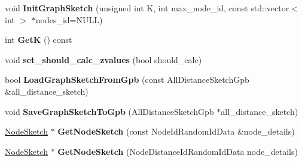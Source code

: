 \begin{DoxyCompactItemize}
\item 
\hypertarget{classall__distance__sketch_1_1GraphSketch_a6d41436a73844dd633b6184a89ce83ff}{}void {\bfseries Init\+Graph\+Sketch} (unsigned int K, int max\+\_\+node\+\_\+id, const std\+::vector$<$ int $>$ $\ast$nodes\+\_\+id=N\+U\+L\+L)\label{classall__distance__sketch_1_1GraphSketch_a6d41436a73844dd633b6184a89ce83ff}

\item 
\hypertarget{classall__distance__sketch_1_1GraphSketch_a32fef9d13b965dd7b5a776596d888a41}{}int {\bfseries Get\+K} () const \label{classall__distance__sketch_1_1GraphSketch_a32fef9d13b965dd7b5a776596d888a41}

\item 
\hypertarget{classall__distance__sketch_1_1GraphSketch_a8d5aaa1b4e94e0361ea0b1afdbfcf8bc}{}void {\bfseries set\+\_\+should\+\_\+calc\+\_\+zvalues} (bool should\+\_\+calc)\label{classall__distance__sketch_1_1GraphSketch_a8d5aaa1b4e94e0361ea0b1afdbfcf8bc}

\item 
\hypertarget{classall__distance__sketch_1_1GraphSketch_a1ec9f5d7a83387252d899833aef82855}{}bool {\bfseries Load\+Graph\+Sketch\+From\+Gpb} (const All\+Distance\+Sketch\+Gpb \&all\+\_\+distance\+\_\+sketch)\label{classall__distance__sketch_1_1GraphSketch_a1ec9f5d7a83387252d899833aef82855}

\item 
\hypertarget{classall__distance__sketch_1_1GraphSketch_a9243b99edf30ba1f1c33d6e45fb1e152}{}void {\bfseries Save\+Graph\+Sketch\+To\+Gpb} (All\+Distance\+Sketch\+Gpb $\ast$all\+\_\+distance\+\_\+sketch)\label{classall__distance__sketch_1_1GraphSketch_a9243b99edf30ba1f1c33d6e45fb1e152}

\item 
\hypertarget{classall__distance__sketch_1_1GraphSketch_ad0b0931712a19b47983a24ef73500316}{}\hyperlink{classall__distance__sketch_1_1NodeSketch}{Node\+Sketch} $\ast$ {\bfseries Get\+Node\+Sketch} (const Node\+Id\+Random\+Id\+Data \&node\+\_\+details)\label{classall__distance__sketch_1_1GraphSketch_ad0b0931712a19b47983a24ef73500316}

\item 
\hypertarget{classall__distance__sketch_1_1GraphSketch_a696af8492f42fbbb60afbc2ff2a68a96}{}\hyperlink{classall__distance__sketch_1_1NodeSketch}{Node\+Sketch} $\ast$ {\bfseries Get\+Node\+Sketch} (Node\+Distance\+Id\+Random\+Id\+Data node\+\_\+details)\label{classall__distance__sketch_1_1GraphSketch_a696af8492f42fbbb60afbc2ff2a68a96}


\end{DoxyCompactItemize}
